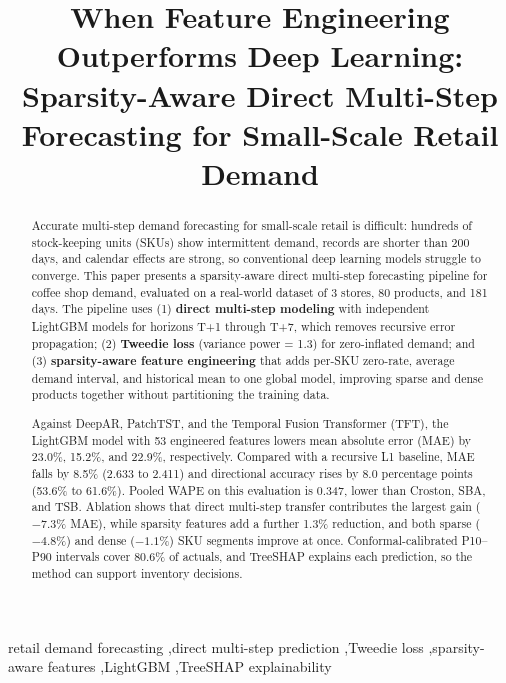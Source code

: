 \documentclass[review,authoryear]{elsarticle}
\begin{document}
\begin{frontmatter}

\title{When Feature Engineering Outperforms Deep Learning: Sparsity-Aware Direct Multi-Step Forecasting for Small-Scale Retail Demand}

\begin{abstract}

Accurate multi-step demand forecasting for small-scale retail is difficult: hundreds of stock-keeping units (SKUs) show intermittent demand, records are shorter than 200 days, and calendar effects are strong, so conventional deep learning models struggle to converge. This paper presents a sparsity-aware direct multi-step forecasting pipeline for coffee shop demand, evaluated on a real-world dataset of 3 stores, 80 products, and 181 days. The pipeline uses (1) \textbf{direct multi-step modeling} with independent LightGBM models for horizons T+1 through T+7, which removes recursive error propagation; (2) \textbf{Tweedie loss} (variance power = 1.3) for zero-inflated demand; and (3) \textbf{sparsity-aware feature engineering} that adds per-SKU zero-rate, average demand interval, and historical mean to one global model, improving sparse and dense products together without partitioning the training data.

Against DeepAR, PatchTST, and the Temporal Fusion Transformer (TFT), the LightGBM model with 53 engineered features lowers mean absolute error (MAE) by 23.0\%, 15.2\%, and 22.9\%, respectively. Compared with a recursive L1 baseline, MAE falls by 8.5\% (2.633 to 2.411) and directional accuracy rises by 8.0 percentage points (53.6\% to 61.6\%). Pooled WAPE on this evaluation is 0.347, lower than Croston, SBA, and TSB. Ablation shows that direct multi-step transfer contributes the largest gain ($-7.3$\% MAE), while sparsity features add a further 1.3\% reduction, and both sparse ($-4.8$\%) and dense ($-1.1$\%) SKU segments improve at once. Conformal-calibrated P10--P90 intervals cover 80.6\% of actuals, and TreeSHAP explains each prediction, so the method can support inventory decisions.

\end{abstract}

\begin{keyword}
retail demand forecasting \sep direct multi-step prediction \sep Tweedie loss \sep sparsity-aware features \sep LightGBM \sep TreeSHAP explainability
\end{keyword}

\end{frontmatter}
\end{document}
